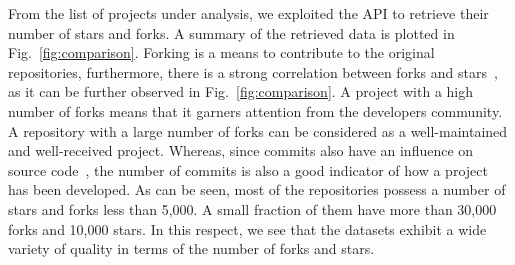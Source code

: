 From the list of projects under analysis, we exploited the \GH API to retrieve 
their number of stars and forks. A summary of the retrieved data is plotted in 
Fig.~\ref{fig:comparison}. %
Forking is a means to contribute to the original repositories, %
furthermore, there is a strong correlation between forks and stars~\cite{7816479}, as it can be further observed in Fig.~\ref{fig:comparison}. A project with a high number of forks means that it garners attention from the developers community. A repository with a large number of forks can be considered as a well-maintained and well-received project. Whereas, since commits also have an influence on source code~\cite{8009930}, the number of commits is also a good indicator of how a project has been developed. As can be seen, most of the repositories possess a number of stars and forks less than 5,000. A small fraction of them have more than 30,000 forks and 10,000 stars. In this respect, we see that the datasets exhibit a wide variety of quality in terms of the number of forks and stars.










